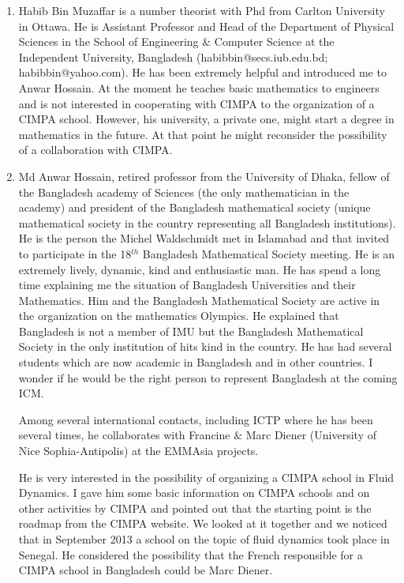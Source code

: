 \documentclass[12pt]{article}
\begin{document}
\begin{enumerate}
\item  Habib Bin Muzaffar is a number theorist with Phd from Carlton University in Ottawa.
He is 
Assistant Professor and Head of the
Department of Physical Sciences in the
School of Engineering \& Computer Science at the
Independent University, Bangladesh
(habibbin@secs.iub.edu.bd; habibbin@yahoo.com). He has been extremely helpful and introduced me to  Anwar Hossain. At the moment he teaches basic mathematics to engineers
and is not interested in cooperating with CIMPA to the organization of a CIMPA school.
However, his university, a private one, might start a degree in mathematics in the future. At that point he might reconsider the possibility of a collaboration with CIMPA.

\item Md Anwar Hossain, retired professor from the University of Dhaka, fellow of the Bangladesh academy of Sciences (the only mathematician in the academy) and president of the Bangladesh mathematical society (unique mathematical society in the country representing all Bangladesh institutions). He is the person the Michel Waldschmidt met
in Islamabad and that invited to participate in the 18$^{th}$ Bangladesh Mathematical Society meeting. 
He is an extremely lively, dynamic, kind and enthusiastic man. He has spend a long time explaining me the situation of Bangladesh Universities and their Mathematics. Him and the Bangladesh Mathematical Society are active in the organization on the mathematics Olympics. He explained that Bangladesh is not a member of IMU but the Bangladesh Mathematical Society in the only institution of hits kind in the country. He has had several students which are now academic in Bangladesh and in other countries. I wonder if he would be the right person to represent Bangladesh at the coming ICM.

Among several international contacts, including ICTP where he has been several times, he collaborates with Francine \& Marc Diener (University of Nice Sophia-Antipolis)	at the EMMAsia projects.

He is very interested in the possibility of organizing a CIMPA school in Fluid
Dynamics. I gave him some basic information on CIMPA schools and on other activities by CIMPA and pointed out that the starting point is the roadmap from the CIMPA website. We looked at it together and we noticed that in September 2013 a school on the topic of fluid dynamics took place in Senegal. He considered the possibility that the French responsible for a CIMPA school in Bangladesh could be Marc Diener.


\end{enumerate}
\end{document}
